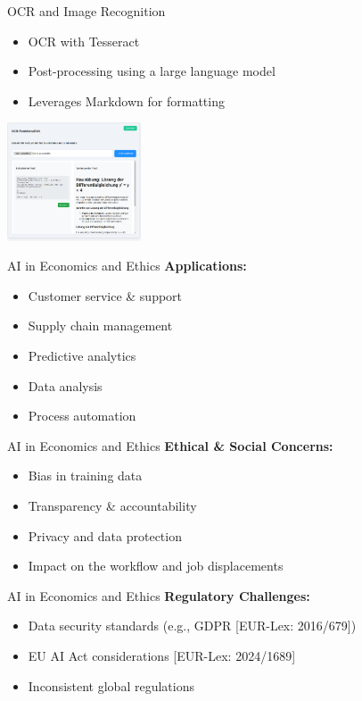 \documentclass{beamer}
\begin{document}
\begin{frame}{OCR and Image Recognition}
  \begin{itemize}
    \item OCR with Tesseract
    \item Post-processing using a large language model
    \item Leverages Markdown for formatting
  \end{itemize}
  \vspace{0.5cm}
  \centering
  \includegraphics[height=3.5cm]{OCR-functonalatie.png} %
\end{frame}


\begin{frame}{AI in Economics and Ethics}
\textbf{Applications:}
        \begin{itemize}
          \item Customer service \& support
          \item Supply chain management
          \item Predictive analytics
          \item Data analysis
          \item Process automation
        \end{itemize}

\end{frame}

\begin{frame}{AI in Economics and Ethics}
\textbf{Ethical \& Social Concerns:}
        \begin{itemize}
          \item Bias in training data
          \item Transparency \& accountability
          \item Privacy and data protection
          \item Impact on the workflow and job displacements
        \end{itemize}
\end{frame}

\begin{frame}{AI in Economics and Ethics}
\textbf{Regulatory Challenges:}
            \begin{itemize}
              \item Data security standards (e.g., GDPR [EUR-Lex: 2016/679])
              \item EU AI Act considerations [EUR-Lex: 2024/1689]
              \item Inconsistent global regulations 
            \end{itemize}
\end{frame}
\end{document}
